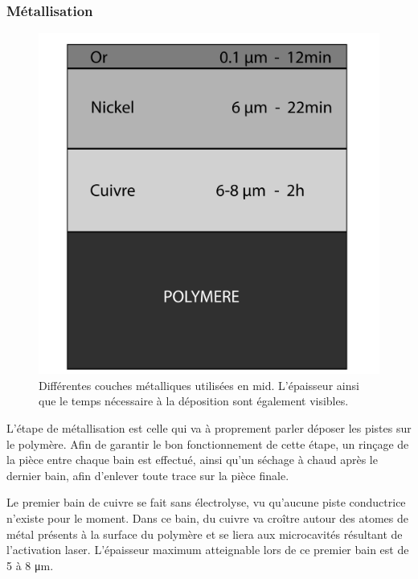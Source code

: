 \subsubsection{Métallisation}
\begin{figure}[h]
    \begin{center}
        \includegraphics[height=0.3\textheight]{../images/CuNiAu}
        \caption{Différentes couches métalliques utilisées en \gls{mid}.
                 L'épaisseur ainsi que le temps nécessaire à la déposition sont également visibles.}
    \end{center}
\end{figure}
L'étape de métallisation est celle qui va à proprement parler déposer les pistes sur le polymère.
Afin de garantir le bon fonctionnement de cette étape, un rinçage de la pièce entre chaque bain est effectué, ainsi qu'un séchage à chaud après le dernier bain, afin d'enlever toute trace sur la pièce finale.

Le premier bain de cuivre se fait sans électrolyse, vu qu'aucune piste conductrice n'existe pour le moment.
Dans ce bain, du cuivre va croître autour des atomes de métal présents à la surface du polymère et se liera aux microcavités résultant de l'activation laser.
L'épaisseur maximum atteignable lors de ce premier bain est de 5 à 8 \si{\micro\meter}.

